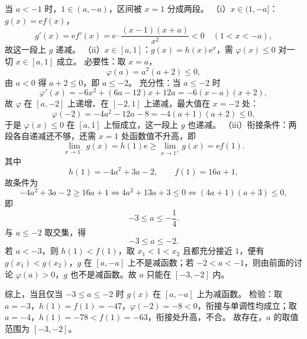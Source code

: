 \begin{answer}
当 $a<-1$ 时，$1\in(a,-a)$，区间被 $x=1$ 分成两段。
（i）$x\in(1,-a]$：$g(x)=\mathrm e f(x)$，
\nopagebreak[4]
\[g'(x)=\mathrm e f'(x)=\mathrm e\cdot\frac{(x-1)(x+a)}{x^2}<0\quad(1<x<-a),\]
故这一段上 $g$ 递减。
（ii）$x\in[a,1]$：$g(x)=h(x)\mathrm e^x$，需 $\varphi(x)\leqslant0$ 对一切 $x\in[a,1]$ 成立。
必要性：取 $x=a$，
\nopagebreak[4]
\[\varphi(a)=a^2(a+2)\leqslant0,\]
由 $a<0$ 得 $a+2\leqslant0$，即 $a\leqslant-2$。
充分性：当 $a\leqslant-2$ 时
\nopagebreak[4]
\[\varphi'(x)=-6x^2+(6a-12)x+12a=-6(x-a)(x+2),\]
故 $\varphi$ 在 $[a,-2]$ 上递增、在 $[-2,1]$ 上递减，最大值在 $x=-2$ 处：
\nopagebreak[4]
\[\varphi(-2)=-4a^2-12a-8=-4(a+1)(a+2)\leqslant0,\]
于是 $\varphi(x)\leqslant0$ 在 $[a,1]$ 上恒成立，这一段上 $g$ 也递减。
（iii）衔接条件：两段各自递减还不够，还需 $x=1$ 处函数值不升高，即
\nopagebreak[4]
\[\lim_{x\to1^-}g(x)=h(1)\mathrm e\geqslant\lim_{x\to1^+}g(x)=\mathrm e f(1).\]
其中
\nopagebreak[4]
\[h(1)=-4a^2+3a-2,\qquad f(1)=16a+1,\]
故条件为
\nopagebreak[4]
\[-4a^2+3a-2\geqslant16a+1\iff4a^2+13a+3\leqslant0\iff(4a+1)(a+3)\leqslant0,\]
即
\nopagebreak[4]
\[-3\leqslant a\leqslant-\frac14.\]
与 $a\leqslant-2$ 取交集，得
\nopagebreak[4]
\[-3\leqslant a\leqslant-2.\]
若 $a<-3$，则 $h(1)<f(1)$，取 $x_1<1<x_2$ 且都充分接近 $1$，便有 $g(x_1)<g(x_2)$，$g$ 在 $[a,-a]$ 上不是减函数；若 $-2<a<-1$，则由前面的讨论 $\varphi(a)>0$，$g$ 也不是减函数。故 $a$ 只能在 $[-3,-2]$ 内。

综上，当且仅当 $-3\leqslant a\leqslant-2$ 时 $g(x)$ 在 $[a,-a]$ 上为减函数。
检验：取 $a=-3$，$h(1)=f(1)=-47$，$\varphi(-2)=-8<0$，衔接与单调性均成立；取 $a=-4$，$h(1)=-78<f(1)=-63$，衔接处升高，不合。
故存在，$a$ 的取值范围为 $[-3,-2]$。


\end{answer}